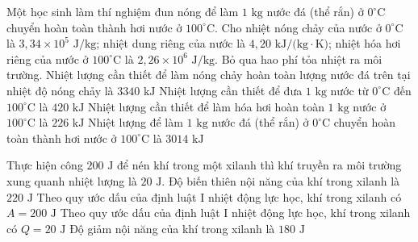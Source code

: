\begin{ex}
	Một học sinh làm thí nghiệm đun nóng để làm $1\text{ kg}$ nước đá (thể rắn) ở $0^\circ\text{C}$ chuyển hoàn toàn thành hơi nước ở $100^\circ\text{C}$. Cho nhiệt nóng chảy của nước ở $0^\circ\text{C}$ là $3{,}34 \times 10^5\text{ J/kg}$; nhiệt dung riêng của nước là $4{,}20\text{ kJ/(kg}\cdot\text{K)}$; nhiệt hóa hơi riêng của nước ở $100^\circ\text{C}$ là $2{,}26 \times 10^6\text{ J/kg}$. Bỏ qua hao phí tỏa nhiệt ra môi trường.
	\choiceTF
	{Nhiệt lượng cần thiết để làm nóng chảy hoàn toàn lượng nước đá trên tại nhiệt độ nóng chảy là $3340\text{ kJ}$}
	{\True Nhiệt lượng cần thiết để đưa $1\text{ kg}$ nước từ $0^\circ\text{C}$ đến $100^\circ\text{C}$ là $420\text{ kJ}$}
	{Nhiệt lượng cần thiết để làm hóa hơi hoàn toàn $1\text{ kg}$ nước ở $100^\circ\text{C}$ là $226\text{ kJ}$}
	{\True Nhiệt lượng để làm $1\text{ kg}$ nước đá (thể rắn) ở $0^\circ\text{C}$ chuyển hoàn toàn thành hơi nước ở $100^\circ\text{C}$ là $3014\text{ kJ}$}
\end{ex}

\begin{ex}
	Thực hiện công $200\text{ J}$ để nén khí trong một xilanh thì khí truyền ra môi trường xung quanh nhiệt lượng là $20\text{ J}$.
	\choiceTF
	{Độ biến thiên nội năng của khí trong xilanh là $220\text{ J}$}
	{\True Theo quy ước dấu của định luật I nhiệt động lực học, khí trong xilanh có $A = 200\text{ J}$}
	{Theo quy ước dấu của định luật I nhiệt động lực học, khí trong xilanh có $Q = 20\text{ J}$}
	{Độ giảm nội năng của khí trong xilanh là $180\text{ J}$}
\end{ex}

